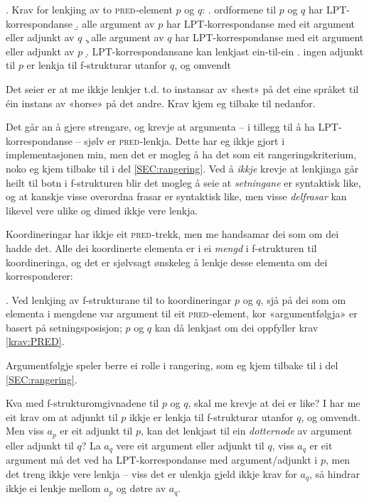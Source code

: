 \documentclass[12pt,a4paper,oneside,draft]{report}
\newcommand{\F}[2]{\textsc{#1}\ensuremath{_{#2}}}
\newcommand{\PRED}{\F{pred}{}}
\begin{document}
\ex. \label{krav:PRED} Krav for lenkjing av to \PRED{}-element $p$ og $q$:
\a. ordformene til $p$ og $q$ har LPT-korrespondanse
\b. alle argument av $p$ har LPT-korrespondanse med eit argument eller adjunkt av $q$
\c. alle argument av $q$ har LPT-korrespondanse med eit argument eller adjunkt av $p$
\d. LPT-korrespondansane kan lenkjast ein-til-ein
\e. ingen adjunkt til $p$ er lenkja til f-strukturar utanfor $q$, og omvendt

Det \Last[d] seier er at me ikkje lenkjer t.d. to instansar av «hest»
på det eine språket til éin instans av «horse» på det andre. Krav
\Last[e] kjem eg tilbake til nedanfor. 

Det går an å gjere \Last strengare, og krevje at argumenta -- i
tillegg til å ha LPT-korrespondanse -- sjølv er \PRED{}-lenkja. Dette har
eg ikkje gjort i implementasjonen min, men det er mogleg å ha det som
eit rangeringskriterium, noko eg kjem tilbake til i del
\ref{SEC:rangering}. Ved å \emph{ikkje} krevje at lenkjinga går heilt til
botn i f-strukturen blir det mogleg å seie at \emph{setningane} er
syntaktisk like, og at kanskje visse overordna frasar er syntaktisk
like, men visse \emph{delfrasar} kan likevel vere ulike og dimed ikkje vere
lenkja.

 Koordineringar har ikkje eit \PRED{}-trekk, men me handsamar dei som
 om dei hadde det. Alle dei koordinerte elementa er i ei \emph{mengd} i
 f-strukturen til koordineringa, og det er sjølvsagt ønskeleg å lenkje
 desse elementa om dei korresponderer:

 \ex. \label{krav:COORD} Ved lenkjing av f-strukturane til to
 koordineringar $p$ og $q$, sjå på dei som om elementa i mengdene var
 argument til eit \PRED{}-element, kor «argumentfølgja» er basert på
 setningsposisjon; $p$ og $q$ kan då lenkjast om dei oppfyller krav
 \ref{krav:PRED}.

 Argumentfølgje speler berre ei rolle i rangering, som eg kjem tilbake
 til i del \ref{SEC:rangering}.

Kva med f-strukturomgivnadene til $p$ og $q$, skal me krevje at dei er
like?  I \Last[e] har me eit krav om at adjunkt til $p$ ikkje er
lenkja til f-strukturar utanfor $q$, og omvendt. Men viss $a_p$ er eit
adjunkt til $p$, kan det lenkjast til ein \emph{dotternode} av argument
eller adjunkt til $q$? La $a_q$ vere eit argument eller adjunkt til
$q$, viss $a_q$ er eit argument må det ved \Last ha LPT-korrespondanse
med argument/adjunkt i $p$, men det treng ikkje vere lenkja -- viss
det er ulenkja gjeld ikkje krav \Last for $a_q$, så \Last hindrar
ikkje ei lenkje mellom $a_p$ og døtre av $a_q$. 
\end{document}

